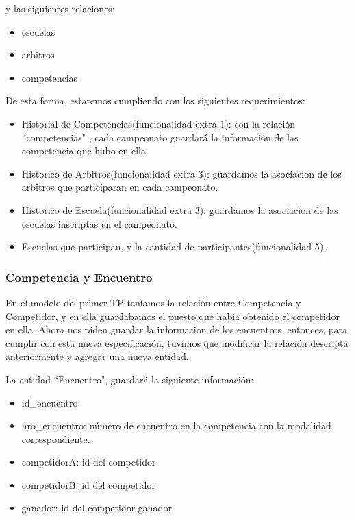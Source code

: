 y las siguientes relaciones:

\begin{itemize}
	\item escuelas
	\item arbitros
	\item competencias
\end{itemize}

 
De esta forma, estaremos cumpliendo con los siguientes requerimientos:

\begin{itemize}

	\item Historial de Competencias(funcionalidad extra 1): con la relación  ``competencias" , cada campeonato guardará la información de las competencia que hubo en ella.

	\item Historico de Arbitros(funcionalidad extra 3): guardamos la asociacion de los arbitros que participaran en cada campeonato.

	\item Historico de Escuela(funcionalidad extra 3): guardamos la asociacion de las escuelas inscriptas en el campeonato.

	\item Escuelas que participan, y la cantidad de participantes(funcionalidad 5).
	
\end{itemize}


\subsubsection{Competencia y Encuentro}

En el modelo del primer TP teníamos la relación entre Competencia y Competidor, y en ella
guardabamos el puesto que habia obtenido el competidor en ella. 
Ahora nos piden guardar la informacion de los encuentros, entonces, para cumplir con esta nueva especificación, tuvimos que modificar la relación descripta anteriormente y agregar una nueva entidad.

La entidad ``Encuentro", guardará la siguiente información:

\begin{itemize}
	\item id_encuentro
	\item nro_encuentro: número de encuentro en la competencia con la modalidad correspondiente.
	\item competidorA: id del competidor
	\item competidorB: id del competidor
	\item ganador: id del competidor ganador 
\end{itemize}

